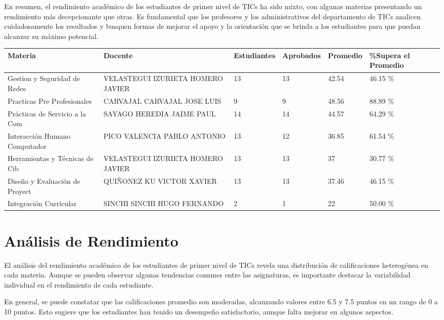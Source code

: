 En resumen, el rendimiento académico de los estudiantes de primer nivel de TICs ha sido mixto, con algunas materias presentando un rendimiento más decepcionante que otras. Es fundamental que los profesores y los administrativos del departamento de TICs analicen cuidadosamente los resultados y busquen formas de mejorar el apoyo y la orientación que se brinda a los estudiantes para que puedan alcanzar su máximo potencial.\\
\vspace{1cm}\small
\begin{tabularx}{\textwidth}{|p{2.5cm}|p{2.5cm}|X|X|X|X|}
\hline
\textbf{Materia} & \textbf{Docente} & \textbf{Estudiantes} & \textbf{Aprobados} & \textbf{Promedio} & \textbf{\%Supera el Promedio} \\ \hline
Gestion y Seguridad de Redes & VELASTEGUI IZURIETA HOMERO JAVIER & 13 & 13 & 42.54 & 46.15 \%\\ \hline
Practicas Pre Profesionales & CARVAJAL CARVAJAL JOSE LUIS & 9 & 9 & 48.56 & 88.89 \%\\ \hline
Prácticas de Servicio a la Com & SAYAGO HEREDIA JAIME PAUL & 14 & 14 & 44.57 & 64.29 \%\\ \hline
Interacción Humano Computador & PICO VALENCIA PABLO ANTONIO & 13 & 12 & 36.85 & 61.54 \%\\ \hline
Herramientas y Técnicas de Cib & VELASTEGUI IZURIETA HOMERO JAVIER & 13 & 13 & 37 & 30.77 \%\\ \hline
Diseño y Evaluación de Proyect & QUIÑONEZ KU VICTOR XAVIER & 13 & 13 & 37.46 & 46.15 \%\\ \hline
Integración Curricular & SINCHI SINCHI HUGO FERNANDO & 2 & 1 & 22 & 50.00 \%\\ \hline
\end{tabularx}

\vspace{1cm}
\section{Análisis de Rendimiento}
El análisis del rendimiento académico de los estudiantes de primer nivel de TICs revela una distribución de calificaciones heterogénea en cada materia. Aunque se pueden observar algunas tendencias comunes entre las asignaturas, es importante destacar la variabilidad individual en el rendimiento de cada estudiante.

En general, se puede constatar que las calificaciones promedio son moderadas, alcanzando valores entre 6.5 y 7.5 puntos en un rango de 0 a 10 puntos. Esto sugiere que los estudiantes han tenido un desempeño satisfactorio, aunque falta mejorar en algunos aspectos.


